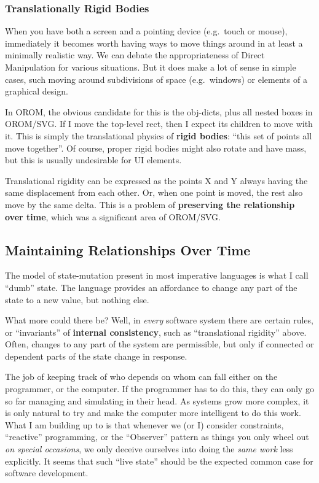 \hypertarget{translationally-rigid-bodies}{%
\subsubsection{Translationally Rigid
Bodies}\label{translationally-rigid-bodies}}

When you have both a screen and a pointing device (e.g.~touch or mouse),
immediately it becomes worth having ways to move things around in at
least a minimally realistic way. We can debate the appropriateness of
Direct Manipulation for various situations. But it does make a lot of
sense in simple cases, such moving around subdivisions of space
(e.g.~windows) or elements of a graphical design.

In OROM, the obvious candidate for this is the obj-dicts, plus all
nested boxes in OROM/SVG. If I move the top-level rect, then I expect
its children to move with it. This is simply the translational physics
of \textbf{rigid bodies}: ``this set of points all move together''. Of
course, proper rigid bodies might also rotate and have mass, but this is
usually undesirable for UI elements.

Translational rigidity can be expressed as the points X and Y always
having the same displacement from each other. Or, when one point is
moved, the rest also move by the same delta. This is a problem of
\textbf{preserving the relationship over time}, which was a significant
area of OROM/SVG.

\hypertarget{maintaining-relationships-over-time}{%
\subsection{Maintaining Relationships Over
Time}\label{maintaining-relationships-over-time}}

The model of state-mutation present in most imperative languages is what
I call ``dumb'' state. The language provides an affordance to change any
part of the state to a new value, but nothing else.

What more could there be? Well, in \emph{every} software system there
are certain rules, or ``invariants'' of \textbf{internal consistency},
such as ``translational rigidity'' above. Often, changes to any part of
the system are permissible, but only if connected or dependent parts of
the state change in response.

The job of keeping track of who depends on whom can fall either on the
programmer, or the computer. If the programmer has to do this, they can
only go so far managing and simulating in their head. As systems grow
more complex, it is only natural to try and make the computer more
intelligent to do this work. What I am building up to is that whenever
we (or I) consider constraints, ``reactive'' programming, or the
``Observer'' pattern as things you only wheel out \emph{on special
occasions}, we only deceive ourselves into doing the \emph{same work}
less explicitly. It seems that such ``live state'' should be the
expected common case for software development.

